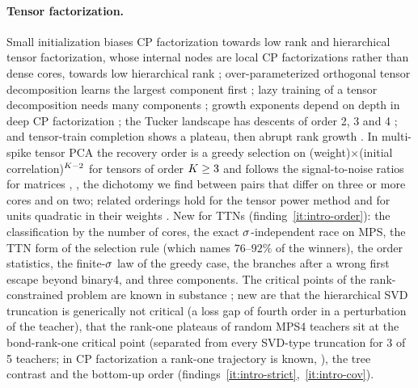 \paragraph{Tensor factorization.} Small initialization biases CP factorization towards low rank
\citep{razin2021implicit} and hierarchical tensor factorization, whose internal nodes are local CP
factorizations rather than dense cores, towards low hierarchical rank \citep{razin2022implicit};
over-parameterized orthogonal tensor decomposition learns the largest component first
\citep{ge2021understanding}; lazy training of a tensor decomposition needs many components
\citep{wang2020beyond}; growth exponents depend on depth in deep CP factorization \citep{hariz2022implicit};
the Tucker landscape has descents of order 2, 3 and 4 \citep{frandsen2022optimization}; and tensor-train
completion shows a plateau, then abrupt rank growth \citep{milanesi2021implicit}. In multi-spike tensor
PCA the recovery order is a greedy selection on (weight)$\times$(initial correlation)$^{K-2}$ for tensors of
order $K\ge3$ and follows the signal-to-noise ratios for matrices \citep[Thm~1.5]{benarous2025stochastic},
\citep[gradient flow, Thm~1.3]{benarous2025permutation}, the dichotomy we find between pairs that differ
on three or more cores and on two; related orderings hold for the tensor power method
\citep[Lemma~5.1]{anandkumar2014tensor} and for units quadratic in their weights
\citep[Prop.~5]{zhang2026saddletosaddle}. New for TTNs (finding~\ref{it:intro-order}): the classification by
the number of cores, the exact $\sigma$-independent race on MPS, the TTN form of the selection rule (which
names $76$--$92\%$ of the winners), the order statistics, the finite-$\sigma$ law of the greedy case, the branches after a wrong first escape beyond
binary4, and three components. The critical points of the rank-constrained problem are known in substance
\citep{elden2011perturbation,holtz2012alternating}; new are that the hierarchical SVD truncation is
generically not critical (a loss gap of fourth order in a perturbation of the teacher), that the rank-one plateaus of random MPS4 teachers sit at
the bond-rank-one critical point (separated from every SVD-type truncation for 3 of 5 teachers; in CP
factorization a rank-one trajectory is known, \citealp{razin2021implicit}), the tree contrast and the
bottom-up order (findings~\ref{it:intro-strict},~\ref{it:intro-cov}).

